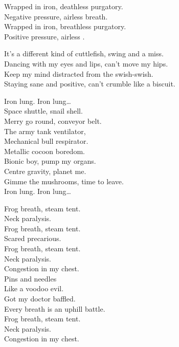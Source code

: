 Wrapped in iron, deathless purgatory. \\
Negative pressure, airless breath. \\
Wrapped in iron, breathless purgatory. \\
Positive pressure, airless . \\


It's a different kind of cuttlefish, swing and a miss. \\
Dancing with my eyes and lips, can't move my hips. \\
Keep my mind distracted from the swish-swish. \\
Staying sane and positive, can't crumble like a biscuit. \\


Iron lung. Iron lung… \\

Space shuttle, snail shell. \\
Merry go round, conveyor belt. \\
The army tank ventilator, \\
Mechanical bull respirator. \\
Metallic cocoon boredom. \\
Bionic boy, pump my organs. \\
Centre gravity, planet me. \\
Gimme the mushrooms, time to leave. \\

Iron lung. Iron lung… \\


Frog breath, steam tent. \\
Neck paralysis. \\
Frog breath, steam tent. \\
Scared precarious. \\
Frog breath, steam tent. \\
Neck paralysis. \\
Congestion in my chest. \\

Pins and needles \\
Like a voodoo evil. \\
Got my doctor baffled. \\
Every breath is an uphill battle. \\
Frog breath, steam tent. \\
Neck paralysis. \\
Congestion in my chest. \\

